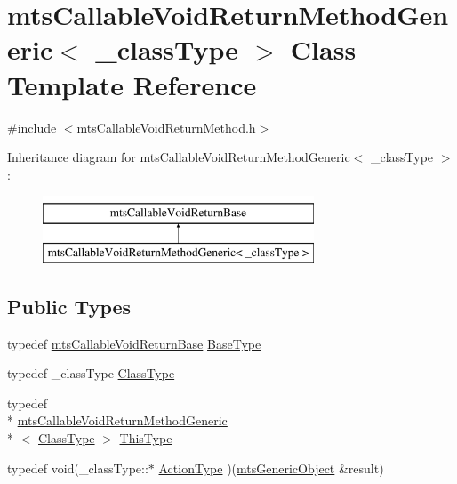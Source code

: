 \hypertarget{classmts_callable_void_return_method_generic}{\section{mts\-Callable\-Void\-Return\-Method\-Generic$<$ \-\_\-class\-Type $>$ Class Template Reference}
\label{classmts_callable_void_return_method_generic}
}


{\ttfamily \#include $<$mts\-Callable\-Void\-Return\-Method.\-h$>$}

Inheritance diagram for mts\-Callable\-Void\-Return\-Method\-Generic$<$ \-\_\-class\-Type $>$\-:\begin{figure}[H]
\begin{center}
\leavevmode
\includegraphics[height=2.000000cm]{d7/d8e/classmts_callable_void_return_method_generic}
\end{center}
\end{figure}
\subsection*{Public Types}
\begin{DoxyCompactItemize}
\item 
typedef \hyperlink{classmts_callable_void_return_base}{mts\-Callable\-Void\-Return\-Base} \hyperlink{classmts_callable_void_return_method_generic_aa1fd13b7b6b83b7825a8e7c56e9ac8cd}{Base\-Type}
\item 
typedef \-\_\-class\-Type \hyperlink{classmts_callable_void_return_method_generic_ac65a16eb6baf786e6eba07bb920cbf1f}{Class\-Type}
\item 
typedef \\*
\hyperlink{classmts_callable_void_return_method_generic}{mts\-Callable\-Void\-Return\-Method\-Generic}\\*
$<$ \hyperlink{classmts_callable_void_return_method_generic_ac65a16eb6baf786e6eba07bb920cbf1f}{Class\-Type} $>$ \hyperlink{classmts_callable_void_return_method_generic_a0c47816060134c2ec22f9287de913cc5}{This\-Type}
\item 
typedef void(\-\_\-class\-Type\-::$\ast$ \hyperlink{classmts_callable_void_return_method_generic_afa8b798ea4b9627d189beecfdc6200b6}{Action\-Type} )(\hyperlink{classmts_generic_object}{mts\-Generic\-Object} \&result)
\end{DoxyCompactItemize}
